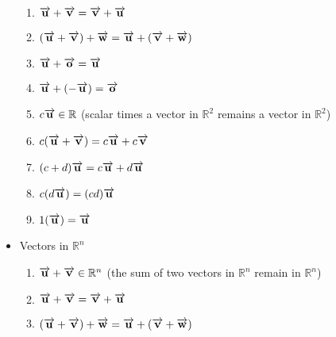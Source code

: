 \documentclass[12pt]{article}
\begin{document}
\begin{itemize}
\begin{enumerate}
      \item $\overrightarrow{\bold{u}} + \overrightarrow{\bold{v}} =\overrightarrow{\bold{v}} + \overrightarrow{\bold{u}}$

      \item $(\overrightarrow{\bold{u}} + \overrightarrow{\bold{v}}) + \overrightarrow{\bold{w}} =\overrightarrow{\bold{u}} + (\overrightarrow{\bold{v}} + \overrightarrow{\bold{w}}) $

      \item $\overrightarrow{\bold{u}}+\overrightarrow{\bold{o}}=\overrightarrow{\bold{u}}$

      \item $\overrightarrow{\bold{u}} + (-\overrightarrow{\bold{u}})=\overrightarrow{\bold{o}}$

      \item $c\overrightarrow{\bold{u}} \in \mathbb{R}$ (scalar times a vector in $\mathbb{R}^2$ remains a vector in $\mathbb{R}^2$)

      \item $c(\overrightarrow{\bold{u}} + \overrightarrow{\bold{v}})=c\overrightarrow{\bold{u}}+c\overrightarrow{\bold{v}}$

      \item $(c+d)\overrightarrow{\bold{u}}=c\overrightarrow{\bold{u}} + d\overrightarrow{\bold{u}}$

      \item $c(d\overrightarrow{\bold{u}})=(cd)\overrightarrow{\bold{u}}$

      \item $1(\overrightarrow{\bold{u}})=\overrightarrow{\bold{u}}$

    \end{enumerate}

  \item Vectors in $\mathbb{R}^n$

    \begin{enumerate}

      \item $\overrightarrow{\bold{u}} + \overrightarrow{\bold{v}} \in \mathbb{R}^n$ (the sum of two vectors in $\mathbb{R}^n$ remain in $\mathbb{R}^n$)

      \item $\overrightarrow{\bold{u}} + \overrightarrow{\bold{v}} =\overrightarrow{\bold{v}} + \overrightarrow{\bold{u}}$

      \item $(\overrightarrow{\bold{u}} + \overrightarrow{\bold{v}}) + \overrightarrow{\bold{w}} =\overrightarrow{\bold{u}} + (\overrightarrow{\bold{v}} + \overrightarrow{\bold{w}}) $


\end{enumerate}
\end{itemize}
\end{document}
